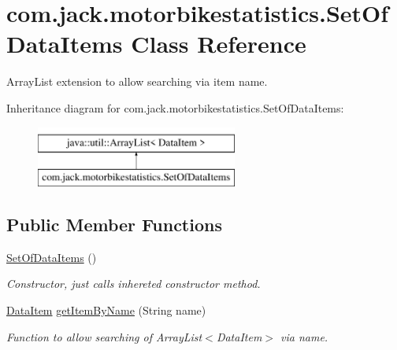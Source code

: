 \hypertarget{classcom_1_1jack_1_1motorbikestatistics_1_1_set_of_data_items}{}\section{com.\+jack.\+motorbikestatistics.\+Set\+Of\+Data\+Items Class Reference}
\label{classcom_1_1jack_1_1motorbikestatistics_1_1_set_of_data_items}


Array\+List extension to allow searching via item name.  


Inheritance diagram for com.\+jack.\+motorbikestatistics.\+Set\+Of\+Data\+Items\+:\begin{figure}[H]
\begin{center}
\leavevmode
\includegraphics[height=2.000000cm]{classcom_1_1jack_1_1motorbikestatistics_1_1_set_of_data_items}
\end{center}
\end{figure}
\subsection*{Public Member Functions}
\begin{DoxyCompactItemize}
\item 
\mbox{\label{classcom_1_1jack_1_1motorbikestatistics_1_1_set_of_data_items_adba096f9c8b7be1b32df7e6ef3f5e8ef}} 
\hyperlink{classcom_1_1jack_1_1motorbikestatistics_1_1_set_of_data_items_adba096f9c8b7be1b32df7e6ef3f5e8ef}{Set\+Of\+Data\+Items} ()
\begin{DoxyCompactList}\small\item\em Constructor, just calls inhereted constructor method. \end{DoxyCompactList}\item 
\hyperlink{classcom_1_1jack_1_1motorbikestatistics_1_1_data_item}{Data\+Item} \hyperlink{classcom_1_1jack_1_1motorbikestatistics_1_1_set_of_data_items_a028fb1f4ce3fd7991d73d368720c19d9}{get\+Item\+By\+Name} (String name)
\begin{DoxyCompactList}\small\item\em Function to allow searching of Array\+List$<$\+Data\+Item$>$ via name. \end{DoxyCompactList}\end{DoxyCompactItemize}


